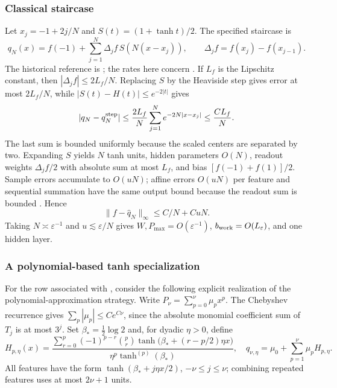 \subsubsection{Classical staircase}
Let $x_j=-1+2j/N$ and $S(t)=(1+\tanh t)/2$. The specified staircase is
\begin{equation}
 q_N(x)=f(-1)+\sum_{j=1}^N\Delta_jf\,S(N(x-x_j)),
 \qquad \Delta_jf=f(x_j)-f(x_{j-1}).
 \label{eq:cmp-staircase}
\end{equation}
The historical reference is \cite{58342}; the rates here concern
. If $L_f$ is the Lipschitz constant, then
$|\Delta_jf|\le2L_f/N$. Replacing $S$ by the Heaviside step gives error
at most $2L_f/N$, while $|S(t)-H(t)|\le e^{-2|t|}$ gives
\[
 |q_N-q_N^{\rm step}|\le\frac{2L_f}{N}
       \sum_{j=1}^Ne^{-2N|x-x_j|}\le\frac{CL_f}{N}.
\]
The last sum is bounded uniformly because the scaled centers are separated
by two. Expanding $S$ yields $N$ tanh units, hidden parameters $O(N)$,
readout weights $\Delta_jf/2$ with absolute sum at most $L_f$, and bias
$[f(-1)+f(1)]/2$. Sample errors accumulate to $O(uN)$; affine errors
$O(uN)$ per feature and sequential summation have the same output bound
because the readout sum is bounded \cite[Chs.~3--4]{Higham2002}. Hence
\begin{equation}
 \|f-\widehat q_N\|_\infty\le C/N+CuN.
 \label{eq:cmp-staircase-error}
\end{equation}
Taking $N\asymp\varepsilon^{-1}$ and $u\lesssim\varepsilon/N$ gives
$W,P_{\max}=O(\varepsilon^{-1})$, $b_{\rm work}=O(L_\varepsilon)$,
and one hidden layer.

\subsubsection{A polynomial-based tanh specialization}
For the row associated with \cite{mhaskar1996approximation}, consider the
following explicit realization of the polynomial-approximation strategy.
Write $P_\nu=\sum_{p=0}^{\nu}\mu_px^p$. The Chebyshev recurrence gives
$\sum_p|\mu_p|\le Ce^{C\nu}$, since the absolute monomial coefficient sum
of $T_j$ is at most $3^j$. Set $\beta_*=\tfrac12\log2$ and, for dyadic
$\eta>0$, define
\begin{equation}
 H_{p,\eta}(x)=
 \frac{\sum_{r=0}^p(-1)^{p-r}\binom pr
       \tanh\!\bigl(\beta_*+(r-p/2)\eta x\bigr)}
      {\eta^p\tanh^{(p)}(\beta_*)},\quad
 q_{\nu,\eta}=\mu_0+\sum_{p=1}^{\nu}\mu_pH_{p,\eta}.
 \label{eq:cmp-mhaskar-features}
\end{equation}
All features have the form $\tanh(\beta_*+j\eta x/2)$,
$-\nu\le j\le\nu$; combining repeated features uses at most $2\nu+1$ units.

